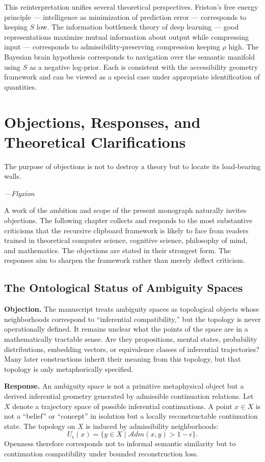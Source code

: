 \documentclass[12pt,oneside]{book}
\theoremstyle{plain}
\theoremstyle{definition}
\theoremstyle{plain}
\begin{document}
This reinterpretation unifies several theoretical perspectives. Friston's free energy principle — intelligence as minimization of prediction error — corresponds to keeping $S$ low. The information bottleneck theory of deep learning — good representations maximize mutual information about output while compressing input — corresponds to admissibility-preserving compression keeping $\rho$ high. The Bayesian brain hypothesis corresponds to navigation over the semantic manifold using $S$ as a negative log-prior. Each is consistent with the accessibility geometry framework and can be viewed as a special case under appropriate identification of quantities.

\chapter{Objections, Responses, and Theoretical Clarifications}
\label{ch:objections}

\epigraph{The purpose of objections is not to destroy a theory but to locate its load-bearing walls.}{\textit{---Flyxion}}

A work of the ambition and scope of the present monograph naturally invites objections. The following chapter collects and responds to the most substantive criticisms that the recursive clipboard framework is likely to face from readers trained in theoretical computer science, cognitive science, philosophy of mind, and mathematics. The objections are stated in their strongest form. The responses aim to sharpen the framework rather than merely deflect criticism.

\section{The Ontological Status of Ambiguity Spaces}

\textbf{Objection.} The manuscript treats ambiguity spaces as topological objects whose neighborhoods correspond to ``inferential compatibility,'' but the topology is never operationally defined. It remains unclear what the points of the space are in a mathematically tractable sense. Are they propositions, mental states, probability distributions, embedding vectors, or equivalence classes of inferential trajectories? Many later constructions inherit their meaning from this topology, but that topology is only metaphorically specified.

\textbf{Response.} An ambiguity space is not a primitive metaphysical object but a derived inferential geometry generated by admissible continuation relations. Let $X$ denote a trajectory space of possible inferential continuations. A point $x \in X$ is not a ``belief'' or ``concept'' in isolation but a locally reconstructable continuation state. The topology on $X$ is induced by admissibility neighborhoods:
\[
U_\epsilon(x) = \{y \in X \mid \mathcal{A}dm(x, y) > 1 - \epsilon\}.
\]
Openness therefore corresponds not to informal semantic similarity but to continuation compatibility under bounded reconstruction loss.
\end{document}
